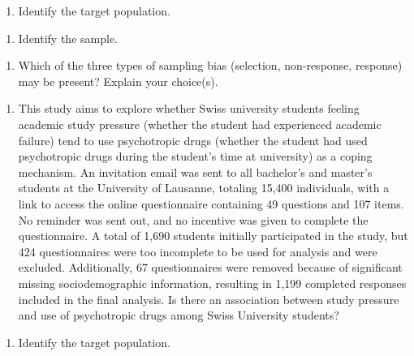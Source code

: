 \documentclass[
]{report}
\providecommand{\tightlist}{%
  \setlength{\itemsep}{0pt}\setlength{\parskip}{0pt}}
\begin{document}
\begin{enumerate}
\def\labelenumi{\alph{enumi}.}
\tightlist
\item
  Identify the target population.
\end{enumerate}

\vspace{0.4in}

\begin{enumerate}
\def\labelenumi{\alph{enumi}.}
\setcounter{enumi}{1}
\tightlist
\item
  Identify the sample.
\end{enumerate}

\vspace{0.4in}

\begin{enumerate}
\def\labelenumi{\alph{enumi}.}
\setcounter{enumi}{2}
\tightlist
\item
  Which of the three types of sampling bias (selection, non-response, response) may be present? Explain your choice(s).
\end{enumerate}

\vspace{0.5in}

\newpage

\begin{enumerate}
\def\labelenumi{\arabic{enumi}.}
\setcounter{enumi}{2}
\tightlist
\item
  This study aims to explore whether Swiss university students feeling academic study pressure (whether the student had experienced academic failure) tend to use psychotropic drugs (whether the student had used psychotropic drugs during the student's time at university) as a coping mechanism. An invitation email was sent to all bachelor's and master's students at the University of Lausanne, totaling 15,400 individuals, with a link to access the online questionnaire containing 49 questions and 107 items. No reminder was sent out, and no incentive was given to complete the questionnaire. A total of 1,690 students initially participated in the study, but 424 questionnaires were too incomplete to be used for analysis and were excluded. Additionally, 67 questionnaires were removed because of significant missing sociodemographic information, resulting in 1,199 completed responses included in the final analysis. Is there an association between study pressure and use of psychotropic drugs among Swiss University students?
\end{enumerate}

\begin{enumerate}
\def\labelenumi{\alph{enumi}.}
\tightlist
\item
  Identify the target population.
\end{enumerate}
\end{document}
